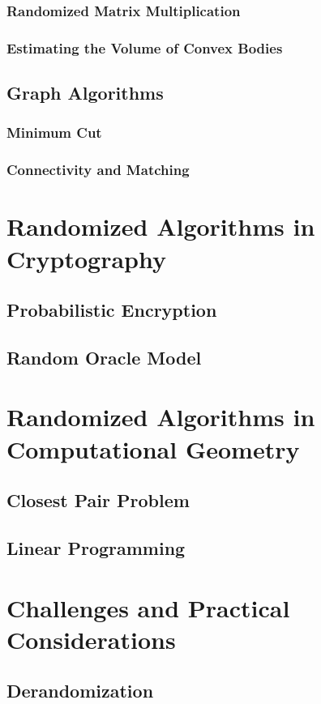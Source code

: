 \documentclass[12pt]{book} %
\begin{document}
\subsubsection{Randomized Matrix Multiplication}
\subsubsection{Estimating the Volume of Convex Bodies}
\subsection{Graph Algorithms}
\subsubsection{Minimum Cut}
\subsubsection{Connectivity and Matching}

\section{Randomized Algorithms in Cryptography}
\subsection{Probabilistic Encryption}
\subsection{Random Oracle Model}

\section{Randomized Algorithms in Computational Geometry}
\subsection{Closest Pair Problem}
\subsection{Linear Programming}

\section{Challenges and Practical Considerations}
\subsection{Derandomization}
\end{document}
